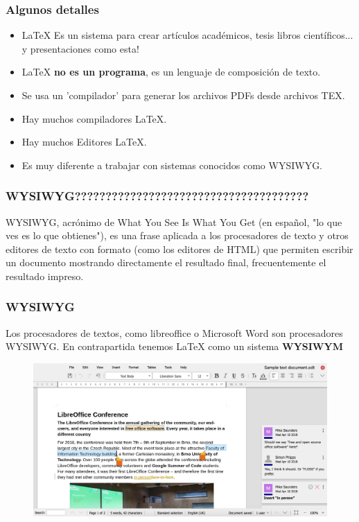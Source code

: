 \documentclass{beamer}
\begin{document}
\begin{frame}
  \frametitle{Algunos detalles}
  \begin{itemize}
      \item \LaTeX{} Es un sistema para crear artículos académicos, tesis  libros científicos... y presentaciones como esta!
      \item \LaTeX{} \textbf{no es un programa}, es un lenguaje de composición de texto.
      \item Se usa un 'compilador' para generar los archivos PDFs desde archivos TEX.
      \item Hay muchos compiladores \LaTeX{}.
      \item Hay muchos Editores \LaTeX{}.
      \item Es muy diferente a trabajar con sistemas conocidos como WYSIWYG.
  \end{itemize}
\end{frame}


\begin{frame}
  \frametitle{WYSIWYG??????????????????????????????????????}
WYSIWYG, acrónimo de What You See Is What You Get (en español, "lo que ves es lo que obtienes"), es una frase aplicada a los procesadores de texto y otros editores de texto con formato (como los editores de HTML) que permiten escribir un documento mostrando directamente el resultado final, frecuentemente el resultado impreso.
\end{frame}

\begin{frame}
\frametitle{WYSIWYG}
Los procesadores de textos, como libreoffice o Microsoft Word son procesadores WYSIWYG. En contrapartida tenemos \LaTeX{} como un sistema \textbf{WYSIWYM}
  \begin{figure}
    \includegraphics[width=0.8\linewidth]{img/libreoffice.jpg}
  \end{figure}
\end{frame}
\end{document}
